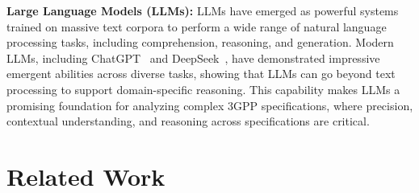 \documentclass[sigconf]{acmart}
\begin{document}
\noindent \textbf{Large Language Models (LLMs):} LLMs have emerged as powerful systems trained on massive text corpora to perform a wide range of natural language processing tasks, including comprehension, reasoning, and generation. Modern LLMs, including ChatGPT~\cite{brown2020language} and DeepSeek~\cite{bi2024deepseek}, have demonstrated impressive emergent abilities across diverse tasks, showing that LLMs can go beyond text processing to support domain-specific reasoning.
This capability makes LLMs a promising foundation for analyzing complex 3GPP specifications, where precision, contextual understanding, and reasoning across specifications are critical. 




\section{Related Work}
\label{sect:related}
\end{document}
